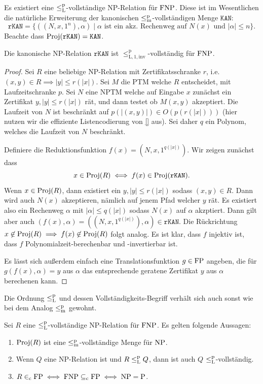 Es existiert eine $\leq_\mathrm{L}^\mathrm{p}$-vollständige NP-Relation für $\mathrm{FNP}$. Diese ist im Wesentlichen die natürliche Erweiterung der kanonischen $\leq_\mathrm{m}^\mathrm{p}$-vollständigen Menge $\mathtt{KAN}$:
\[ \mathtt{rKAN} = \{ ((N,x,1^n), \alpha) \mid \text{$\alpha$ ist ein akz. Rechenweg auf $N(x)$ und $|\alpha|\leq n$} \}. \]
Beachte dass $\operatorname{Proj}(\mathtt{rKAN})=\mathtt{KAN}$.
\begin{theorem}
    Die kanonische NP-Relation $\mathtt{rKAN}$ 
    ist $\leq_\mathrm{L,1,inv}^\mathrm p$-vollständig für $\mathrm{FNP}$.
\end{theorem}
\begin{proof}
    Sei $R$ eine beliebige NP-Relation mit Zertifikatsschranke $r$, i.e. $(x,y)\in R\implies |y|\leq r(|x|)$. Sei $M$ die PTM welche $R$ entscheidet, mit Laufzeitschranke $p$. Sei $N$ eine NPTM welche auf Eingabe $x$ zunächst ein Zertifikat $y, |y|\leq r(|x|)$ rät, und dann testet ob $M(x,y)$ akzeptiert. Die Laufzeit von $N$ ist beschränkt auf $p(|(x,y)|)\in O(p(r(|x|)))$ (hier nutzen wir die effiziente Listencodierung von \ref{} aus). Sei daher $q$ ein Polynom, welches die Laufzeit von $N$ beschränkt.

    Definiere die Reduktionsfunktion $f(x)=(N, x, 1^{q(|x|)})$. Wir zeigen zunächst dass
    \[ x\in \operatorname{Proj}(R)\iff f(x)\in \operatorname{Proj}(\mathtt{rKAN}). \]
    Wenn $x\in\operatorname{Proj}(R)$, dann existiert ein $y, |y|\leq r(|x|)$ sodass $(x,y)\in R$. Dann wird auch $N(x)$ akzeptieren, nämlich auf jenem Pfad welcher $y$ rät. Es existiert also ein Rechenweg $\alpha$ mit $|\alpha|\leq q(|x|)$ sodass $N(x)$ auf $\alpha$ akzptiert. Dann gilt aber auch $(f(x), \alpha)=((N,x,1^{q(|x|)}),\alpha)\in \mathtt{rKAN}$.
    Die Rückrichtung $x\not\in \operatorname{Proj}(R)\implies f(x)\not\in\operatorname{Proj}(R)$ folgt analog.
    Es ist klar, dass $f$ injektiv ist, dass $f$ Polynomialzeit-berechenbar und -invertierbar ist. 

    Es lässt sich außerdem einfach eine Translationsfunktion $g\in \mathrm{FP}$ angeben, die für $g(f(x), \alpha)=y$ aus $\alpha$ das entsprechende geratene Zertifikat $y$ aus $\alpha$ berechenen kann.
\end{proof}

Die Ordnung $\leq_\mathrm{L}^\mathrm{p}$ und dessen Vollständigkeits-Begriff verhält sich auch sonst wie bei dem Analog $\leq_\mathrm{m}^\mathrm{p}$ gewohnt.
\begin{lemma}\label{lemma:fnp-completeness}
    Sei $R$ eine $\leq_\mathrm{L}^\mathrm{p}$-vollständige NP-Relation für $\mathrm{FNP}$. Es gelten folgende Aussagen:
    \begin{enumerate}
        \item $\operatorname{Proj}(R)$ ist eine $\leq_\mathrm{m}^\mathrm{p}$-vollständige Menge für $\mathrm{NP}$.
        \item Wenn $Q$ eine NP-Relation ist und $R\leq_\mathrm{L}^\mathrm{p} Q$, dann ist auch $Q$ $\leq_\mathrm{L}^\mathrm{p}$-vollständig.
        \item $R\in_\mathrm{c} \mathrm{FP} \iff \mathrm{FNP} \subseteq_\mathrm{c} \mathrm{FP} \iff \mathrm{NP}=\mathrm{P}$.
    \end{enumerate}
\end{lemma}

